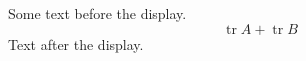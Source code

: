 \documentclass[12pt]{article}
\DeclareMathOperator{\tr}{tr}
\begin{document}
Some text before the display.
\[ \tr A + \tr B \]
Text after the display.
\end{document}

